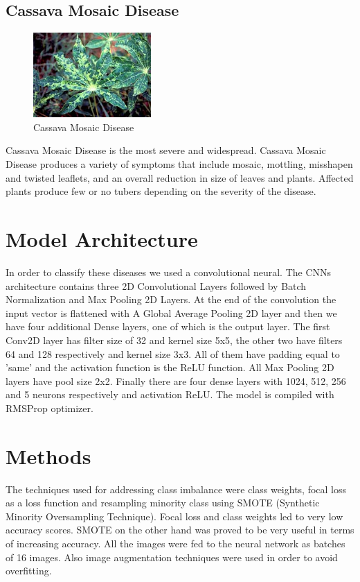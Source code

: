 \documentclass{article}
\begin{document}
\subsection{Cassava Mosaic Disease}
\begin{figure}[!htb]
    \centering
    \includegraphics[width=0.4\textwidth]{image.jpeg}
    \caption{Cassava Mosaic Disease}
    \label{CBB}
\end{figure}


Cassava Mosaic Disease is the most severe and widespread. Cassava Mosaic Disease produces a variety of symptoms that include mosaic, mottling, misshapen and twisted leaflets, and an overall reduction in size of leaves and plants. Affected plants produce few or no tubers depending on the severity of the disease.



\cite{cmd}
\section{Model Architecture}

In order to classify these diseases we used a convolutional neural. The CNNs architecture contains three 2D Convolutional Layers followed by Batch Normalization and Max Pooling 2D Layers. At the end of the convolution the input vector is flattened with A Global Average Pooling 2D layer and then we have four additional Dense layers, one of which is the output layer. The first Conv2D layer has filter size of 32 and kernel size 5x5, the other two have filters 64 and 128 respectively and kernel size 3x3. All of them have padding equal to 'same' and the activation function is the ReLU function. All Max Pooling 2D layers have pool size 2x2. Finally there are four dense layers with 1024, 512, 256 and 5 neurons respectively and activation ReLU. The model is compiled with RMSProp optimizer.


\section{Methods}

The techniques used for addressing class imbalance were class weights, focal loss as a loss function and resampling minority class using SMOTE (Synthetic Minority Oversampling Technique). Focal loss and class weights led to very low accuracy scores. SMOTE on the other hand was proved to be very useful in terms of increasing accuracy. All the images were fed to the neural network as batches of 16 images. Also image augmentation techniques were used in order to avoid overfitting.
\end{document}
